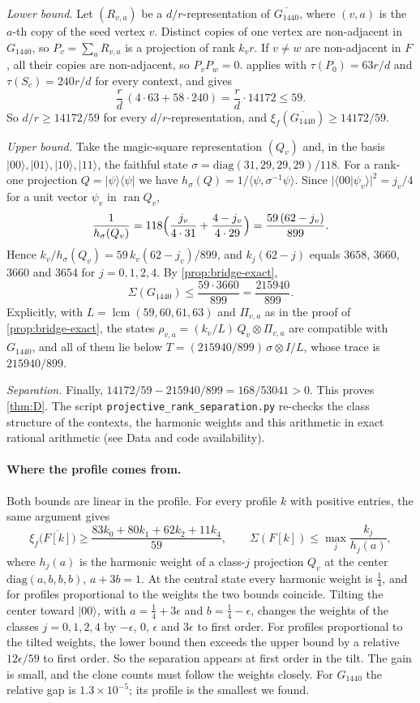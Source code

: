 \documentclass[11pt]{article}
\theoremstyle{definition}
\DeclareMathOperator{\ran}{ran}
\newcommand{\ket}[1]{\lvert #1\rangle}
\newcommand{\bra}[1]{\langle #1\rvert}
\newcommand{\proj}[1]{\ket{#1}\!\bra{#1}}
\begin{document}
\emph{Lower bound.}  Let $(R_{v,a})$ be a $d/r$-representation of
$\overline{G_{1440}}$, where $(v,a)$ is the $a$-th copy of the seed vertex
$v$.  Distinct copies of one vertex are non-adjacent in $G_{1440}$, so
$P_v=\sum_aR_{v,a}$ is a projection of rank $k_vr$.  If $v\ne w$ are
non-adjacent in $F$, all their copies are non-adjacent, so $P_vP_w=0$.
 applies with $\tau(P_0)=63r/d$ and $\tau(S_c)=240r/d$
for every context, and gives
\[
 \frac rd\,(4\cdot63+58\cdot240)=\frac rd\cdot14172\le59 .
\]
So $d/r\ge14172/59$ for every $d/r$-representation, and
$\xi_f(\overline{G_{1440}})\ge14172/59$.

\emph{Upper bound.}  Take the magic-square representation $(Q_v)$ and, in
the basis $\ket{00},\ket{01},\ket{10},\ket{11}$, the faithful state
$\sigma=\mathrm{diag}(31,29,29,29)/118$.  For a rank-one projection
$Q=\proj\psi$ we have $h_\sigma(Q)=1/\langle\psi,\sigma^{-1}\psi\rangle$.
Since $\lvert\langle00|\psi_v\rangle\rvert^2=j_v/4$ for a unit vector
$\psi_v$ in $\ran Q_v$,
\[
 \frac1{h_\sigma(Q_v)}=118\Bigl(\frac{j_v}{4\cdot31}+\frac{4-j_v}{4\cdot29}\Bigr)
 =\frac{59\,(62-j_v)}{899}.
\]
Hence $k_v/h_\sigma(Q_v)=59\,k_v(62-j_v)/899$, and $k_j(62-j)$ equals
$3658$, $3660$, $3660$ and $3654$ for $j=0,1,2,4$.  By
\cref{prop:bridge-exact},
\[
 \Sigma(G_{1440})\le\frac{59\cdot3660}{899}=\frac{215940}{899}.
\]
Explicitly, with $L=\operatorname{lcm}(59,60,61,63)$ and $\Pi_{v,a}$ as in
the proof of \cref{prop:bridge-exact}, the states
$\rho_{v,a}=(k_v/L)\,Q_v\otimes\Pi_{v,a}$ are compatible with $G_{1440}$, and
all of them lie below $T=(215940/899)\,\sigma\otimes I/L$, whose trace is
$215940/899$.

\emph{Separation.}  Finally, $14172/59-215940/899=168/53041>0$.  This proves
\cref{thm:D}.  The script \texttt{projective\_rank\_separation.py} re-checks
the class structure of the contexts, the harmonic weights and this
arithmetic in exact rational arithmetic (see Data and code availability).

\paragraph{Where the profile comes from.}
Both bounds are linear in the profile.  For every profile $k$ with positive
entries, the same argument gives
\[
 \xi_f\bigl(\overline{F[k]}\bigr)\ge\frac{83k_0+80k_1+62k_2+11k_4}{59},
 \qquad
 \Sigma(F[k])\le\max_{j}\frac{k_j}{h_j(a)},
\]
where $h_j(a)$ is the harmonic weight of a class-$j$ projection $Q_v$ at the
center $\mathrm{diag}(a,b,b,b)$, $a+3b=1$.  At the central state every
harmonic weight is $\frac14$, and for profiles proportional to the weights
the two bounds coincide.  Tilting the center toward $\ket{00}$, with
$a=\frac14+3\epsilon$ and $b=\frac14-\epsilon$, changes the weights of the
classes $j=0,1,2,4$ by $-\epsilon$, $0$, $\epsilon$ and $3\epsilon$ to first
order.  For profiles proportional to the tilted weights, the lower bound then
exceeds the upper bound by a relative $12\epsilon/59$ to first order.  So the
separation appears at first order in the tilt.  The gain is small, and the
clone counts must follow the weights closely.  For $G_{1440}$ the relative
gap is $1.3\times10^{-5}$; its profile is the smallest we found.
\end{document}
